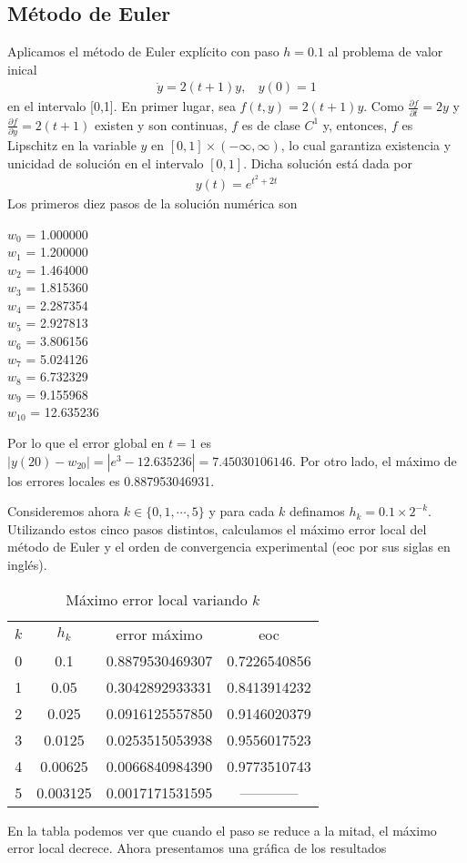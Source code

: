 \documentclass[spanish]{article}
\begin{document}
\subsection{Método de Euler}
Aplicamos el método de Euler explícito con paso $h = 0.1$ al problema de valor inical
\begin{align}
\dot{y} = 2(t+1)y, \ \ \ \ y(0) = 1
\end{align}
en el intervalo [0,1]. En primer lugar, sea $f(t,y) = 2(t+1)y$. Como $\frac{\partial f}{\partial t} = 2y$ y $\frac{\partial f}{\partial y} = 2(t+1)$ existen y son continuas, $f$ es de clase $C^1$ y, entonces, $f$ es Lipschitz en la variable $y$ en $[0,1] \times (- \infty, \infty)$, lo cual garantiza existencia y unicidad de solución en el intervalo $[0,1]$. Dicha solución está dada por
\begin{align}
y(t) = e^{t^2+2t}
\end{align}
Los primeros diez pasos de la solución numérica son
\begin{multicols}{3}
\noindent
$w_0$ = 1.000000\\
$w_1$ = 1.200000 \\
$w_2$ = 1.464000 \\
$w_3$ = 1.815360 \\
$w_4$ = 2.287354 \\
$w_5$ = 2.927813 \\
$w_6$ = 3.806156 \\
$w_7$ = 5.024126 \\
$w_8$ = 6.732329 \\
$w_9$ = 9.155968 \\
$w_{10}$ = 12.635236
\end{multicols}
\noindent
Por lo que el error global en $t=1$ es $|y(20)-w_{20}| = |e^3 - 12.635236| = 
7.45030106146.$ Por otro lado, el máximo de los errores locales es 0.887953046931. 


Consideremos ahora $k \in \{0, 1, \cdots, 5\}$ y para cada $k$ definamos $h_k =
0.1 \times 2^{-k}$.  Utilizando estos cinco pasos distintos, calculamos el máximo
error local del método de Euler y el orden de convergencia experimental (eoc por sus 
siglas en inglés).

\begin{table}[h]
\caption{Máximo error local variando $k$}
\centering
\begin{tabular}{cccc}
\hline \hline
$k$ & $h_k$ & error máximo & eoc \\ [0.5ex]
0 & 0.1 &  0.8879530469307 & 0.7226540856 \\
1 & 0.05 & 0.3042892933331 & 0.8413914232 \\
2 & 0.025 & 0.0916125557850 & 0.9146020379 \\
3 & 0.0125 & 0.0253515053938 & 0.9556017523 \\
4 & 0.00625 & 0.0066840984390 & 0.9773510743 \\
5 & 0.003125 & 0.0017171531595 & ------------ \\
\hline
\end{tabular}
\label{tab:hresult}
\end{table}
\newpage
En la tabla podemos ver que cuando el paso se reduce a la mitad, el máximo
error local decrece.
Ahora presentamos una gráfica de los resultados
\end{document}
